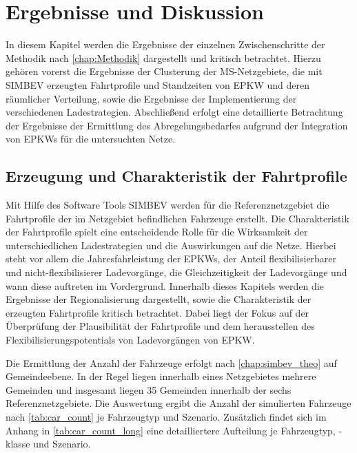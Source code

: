 
\section{Ergebnisse und Diskussion}\label{chap:results}

In diesem Kapitel werden die Ergebnisse der einzelnen Zwischenschritte der Methodik nach \autoref{chap:Methodik} dargestellt und kritisch betrachtet.
Hierzu gehören vorerst die Ergebnisse der Clusterung der \gls{MS}-Netzgebiete, die mit \gls{SIMBEV} erzeugten Fahrtprofile und Standzeiten von \gls{EPKW} und deren räumlicher Verteilung, sowie die Ergebnisse der Implementierung der verschiedenen Ladestrategien.
Abschließend erfolgt eine detaillierte Betrachtung der Ergebnisse der Ermittlung des Abregelungsbedarfes aufgrund der Integration von \glspl{EPKW} für die untersuchten Netze.


\subsection{Erzeugung und Charakteristik der Fahrtprofile}

Mit Hilfe des Software Tools \gls{SIMBEV} werden für die Referenznetzgebiet die Fahrtprofile der im Netzgebiet befindlichen Fahrzeuge erstellt.
Die Charakteristik der Fahrtprofile spielt eine entscheidende Rolle für die Wirksamkeit der unterschiedlichen Ladestrategien und die Auswirkungen auf die Netze.
Hierbei steht vor allem die Jahresfahrleistung der \glspl{EPKW}, der Anteil flexibilisierbarer und nicht-flexibilisierer Ladevorgänge, die Gleichzeitigkeit der Ladevorgänge und wann diese auftreten im Vordergrund.
Innerhalb dieses Kapitels werden die Ergebnisse der Regionalisierung dargestellt, sowie die Charakteristik der erzeugten Fahrtprofile kritisch betrachtet.
Dabei liegt der Fokus auf der Überprüfung der Plausibilität der Fahrtprofile und dem herausstellen des Flexibilisierungspotentials von Ladevorgängen von \gls{EPKW}.\medskip

Die Ermittlung der Anzahl der Fahrzeuge erfolgt nach \autoref{chap:simbev_theo} auf Gemeindeebene.
In der Regel liegen innerhalb eines Netzgebietes mehrere Gemeinden und insgesamt liegen \num{35} Gemeinden innerhalb der sechs Referenznetzgebiete.
Die Auswertung ergibt die Anzahl der simulierten Fahrzeuge nach \autoref{tab:car_count} je Fahrzeugtyp und Szenario.
Zusätzlich findet sich im Anhang in \autoref{tab:car_count_long} eine detailliertere Aufteilung je Fahrzeugtyp, -klasse und Szenario.



